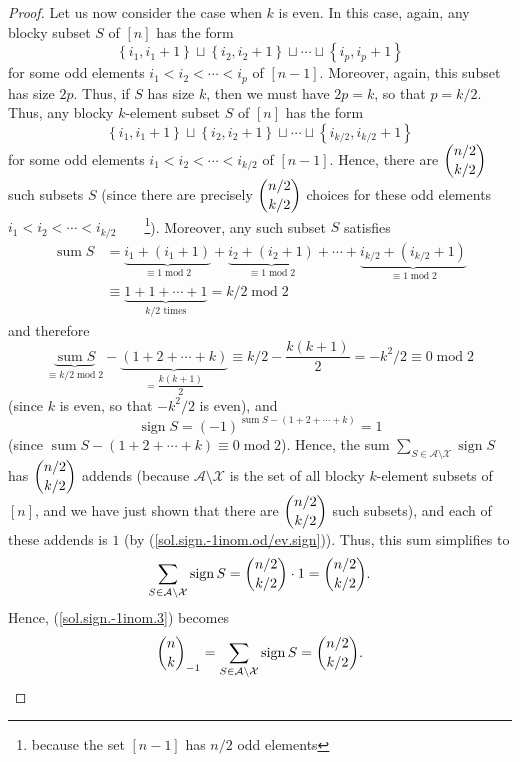 \begin{proof}
Let us now consider the case when $k$ is even. In this case, again, any blocky
subset $S$ of $\left[  n\right]  $ has the form%
\[
\left\{  i_{1},i_{1}+1\right\}  \sqcup\left\{  i_{2},i_{2}+1\right\}
\sqcup\cdots\sqcup\left\{  i_{p},i_{p}+1\right\}
\]
for some odd elements $i_{1}<i_{2}<\cdots<i_{p}$ of $\left[  n-1\right]  $.
Moreover, again, this subset has size $2p$. Thus, if $S$ has size $k$, then we
must have $2p=k$, so that $p=k/2$. Thus, any blocky $k$-element subset $S$ of
$\left[  n\right]  $ has the form
\[
\left\{  i_{1},i_{1}+1\right\}  \sqcup\left\{  i_{2},i_{2}+1\right\}
\sqcup\cdots\sqcup\left\{  i_{k/2},i_{k/2}+1\right\}
\]
for some odd elements $i_{1}<i_{2}<\cdots<i_{k/2}$ of $\left[  n-1\right]  $.
Hence, there are $\dbinom{n/2}{k/2}$ such subsets $S$ (since there are
precisely $\dbinom{n/2}{k/2}$ choices for these odd elements $i_{1}%
<i_{2}<\cdots<i_{k/2}$\ \ \ \ \footnote{because the set $\left[  n-1\right]  $
has $n/2$ odd elements}). Moreover, any such subset $S$ satisfies%
\begin{align*}
\operatorname*{sum}S  &  =\underbrace{i_{1}+\left(  i_{1}+1\right)  }%
_{\equiv1\operatorname{mod}2}+\underbrace{i_{2}+\left(  i_{2}+1\right)
}_{\equiv1\operatorname{mod}2}+\cdots+\underbrace{i_{k/2}+\left(
i_{k/2}+1\right)  }_{\equiv1\operatorname{mod}2}\\
&  \equiv\underbrace{1+1+\cdots+1}_{k/2\text{ times}}=k/2\operatorname{mod}2
\end{align*}
and therefore%
\[
\underbrace{\operatorname*{sum}S}_{\equiv k/2\operatorname{mod}2}%
-\underbrace{\left(  1+2+\cdots+k\right)  }_{=\dfrac{k\left(  k+1\right)  }%
{2}}\equiv k/2-\dfrac{k\left(  k+1\right)  }{2}=-k^{2}/2\equiv
0\operatorname{mod}2
\]
(since $k$ is even, so that $-k^{2}/2$ is even), and%
\begin{equation}
\operatorname*{sign}S=\left(  -1\right)  ^{\operatorname*{sum}S-\left(
1+2+\cdots+k\right)  }=1 \label{sol.sign.-1inom.od/ev.sign}%
\end{equation}
(since $\operatorname*{sum}S-\left(  1+2+\cdots+k\right)  \equiv
0\operatorname{mod}2$). Hence, the sum $\sum_{S\in\mathcal{A}\setminus
\mathcal{X}}\operatorname*{sign}S$ has $\dbinom{n/2}{k/2}$ addends (because
$\mathcal{A}\setminus\mathcal{X}$ is the set of all blocky $k$-element subsets
of $\left[  n\right]  $, and we have just shown that there are $\dbinom
{n/2}{k/2}$ such subsets), and each of these addends is $1$ (by
(\ref{sol.sign.-1inom.od/ev.sign})). Thus, this sum simplifies to%
\[
\sum_{S\in\mathcal{A}\setminus\mathcal{X}}\operatorname*{sign}S=\dbinom
{n/2}{k/2}\cdot1=\dbinom{n/2}{k/2}.
\]
Hence, (\ref{sol.sign.-1inom.3}) becomes%
\begin{equation}
\dbinom{n}{k}_{-1}=\sum_{S\in\mathcal{A}\setminus\mathcal{X}}%
\operatorname*{sign}S=\dbinom{n/2}{k/2}. \label{sol.sign.-1inom.ev/ev}%
\end{equation}



\end{proof}

